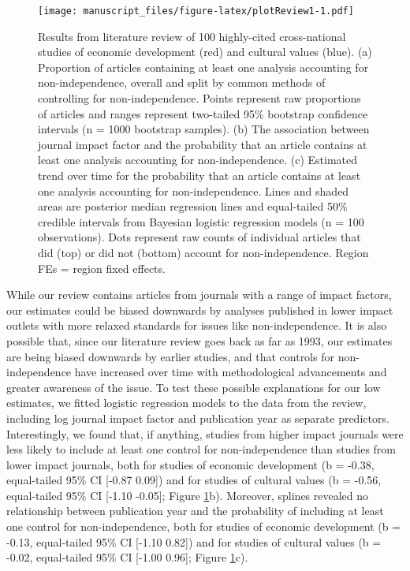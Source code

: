 \documentclass[
  man,floatsintext]{apa6}
\begin{document}
\begin{figure}
\centering
\texttt{[image: manuscript\_files/figure-latex/plotReview1-1.pdf]}
\caption{\label{fig:plotReview1}Results from literature review of 100 highly-cited cross-national studies of economic development (red) and cultural values (blue). (a) Proportion of articles containing at least one analysis accounting for non-independence, overall and split by common methods of controlling for non-independence. Points represent raw proportions of articles and ranges represent two-tailed 95\% bootstrap confidence intervals (n = 1000 bootstrap samples). (b) The association between journal impact factor and the probability that an article contains at least one analysis accounting for non-independence. (c) Estimated trend over time for the probability that an article contains at least one analysis accounting for non-independence. Lines and shaded areas are posterior median regression lines and equal-tailed 50\% credible intervals from Bayesian logistic regression models (n = 100 observations). Dots represent raw counts of individual articles that did (top) or did not (bottom) account for non-independence. Region FEs = region fixed effects.}
\end{figure}

While our review contains articles from journals with a range of impact factors, our estimates could be biased downwards by analyses published in lower impact outlets with more relaxed standards for issues like non-independence. It is also possible that, since our literature review goes back as far as 1993, our estimates are being biased downwards by earlier studies, and that controls for non-independence have increased over time with methodological advancements and greater awareness of the issue. To test these possible explanations for our low estimates, we fitted logistic regression models to the data from the review, including log journal impact factor and publication year as separate predictors. Interestingly, we found that, if anything, studies from higher impact journals were less likely to include at least one control for non-independence than studies from lower impact journals, both for studies of economic development (b = -0.38, equal-tailed 95\% CI {[}-0.87 0.09{]}) and for studies of cultural values (b = -0.56, equal-tailed 95\% CI {[}-1.10 -0.05{]}; Figure \ref{fig:plotReview1}b). Moreover, splines revealed no relationship between publication year and the probability of including at least one control for non-independence, both for studies of economic development (b = -0.13, equal-tailed 95\% CI {[}-1.10 0.82{]}) and for studies of cultural values (b = -0.02, equal-tailed 95\% CI {[}-1.00 0.96{]}; Figure \ref{fig:plotReview1}c).
\end{document}
